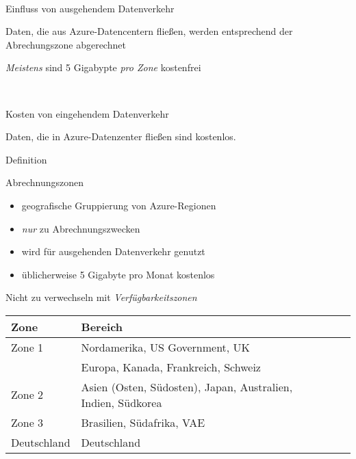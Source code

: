 \documentclass{scrartcl}
\newenvironment{flashcard}[2][]{%
    #1
    \vfill
    \centerline{\Large{#2}}
    \vfill
\newpage
}
{\newpage}
\begin{document}
    \begin{flashcard}[\ ]{Einfluss von ausgehendem Datenverkehr}
        Daten, die aus Azure-Datencentern fließen, werden entsprechend der Abrechungszone abgerechnet

        \vspace{5mm}
        \emph{Meistens} sind 5 Gigabypte \emph{pro Zone} kostenfrei
    \end{flashcard}

    \begin{flashcard}[\ ]{Kosten von eingehendem Datenverkehr}
        Daten, die in Azure-Datenzenter fließen sind kostenlos.
    \end{flashcard}

    \begin{flashcard}[Definition]{Abrechnungszonen}
        \begin{itemize}
            \item geografische Gruppierung von Azure-Regionen
            \item \emph{nur} zu Abrechnungszwecken
            \item wird für ausgehenden Datenverkehr genutzt
            \item üblicherweise 5 Gigabyte pro Monat kostenlos
        \end{itemize}
        Nicht zu verwechseln mit \emph{Verfügbarkeitszonen}

        \begin{tabular}{l|lll}
            Zone        &  Bereich\\
            \hline
            Zone 1      &  Nordamerika, US Government, UK\\
                        & Europa, Kanada, Frankreich, Schweiz\\
            Zone 2      &  Asien (Osten, Südosten), Japan, Australien, Indien, Südkorea\\
            Zone 3      &  Brasilien, Südafrika, VAE\\
            Deutschland & Deutschland\\
        \end{tabular}

    \end{flashcard}
\end{document}
